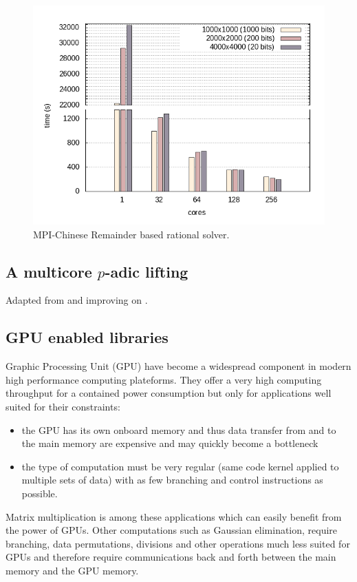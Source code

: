 \begin{figure}[htb]
\begin{center}
  \includegraphics[width=.7\textwidth]{nodes_histogram}
\end{center}
\caption{MPI-Chinese Remainder based rational solver.}\label{fig:mpi_histo}
\end{figure}
\subsection{A multicore $p$-adic lifting}

Adapted from and improving on \cite{ChSt05}.

\subsection{GPU enabled libraries}

Graphic Processing Unit (GPU) have become a widespread component in modern high performance computing plateforms. They
offer a very high computing throughput for a contained power consumption but only for applications well suited for their
constraints:
\begin{itemize}
\item the GPU has its own onboard memory and thus data transfer from and to the main memory are expensive and may
  quickly become a bottleneck
\item the type of computation must be very regular (same code kernel applied to multiple sets of data) with as few
  branching and control instructions as possible.
\end{itemize}

Matrix multiplication is among these applications which can easily benefit from the power of GPUs. Other computations
such as Gaussian elimination, require branching, data permutations, divisions and other operations much less suited for
GPUs and therefore require communications back and forth between the main memory and the GPU memory.

